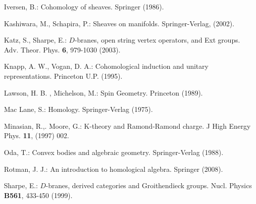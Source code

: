 \documentclass[xypic,amscd,syntonly,amssymb,verbatim,12pt]{amsart}
\theoremstyle{plain}
\theoremstyle{definition}
\theoremstyle{remark}
\numberwithin{equation}{section}
\begin{document}
\begin{thebibliography}{99}
Iversen, B.: Cohomology of sheaves.  Springer (1986).







 




 Kashiwara, M., Schapira, P.:  Sheaves on manifolds.
  Springer-Verlag,
 (2002).



 Katz, S., Sharpe, E.: $D$-branes, open string vertex operators, and Ext groups. Adv. Theor. Phys. {\bf 6},  979-1030 (2003).








 
  
  
 


 
 

 Knapp, A. W., Vogan, D. A.:  Cohomological induction and unitary representations.
 Princeton U.P. (1995).


 



 Lawson, H. B. , Michelson, M.: Spin Geometry. Princeton (1989).




 



 
 





Mac Lane, S.: Homology. Springer-Verlag (1975).


 Minasian, R.,. Moore, G.: K-theory and Ramond-Ramond charge. J High
 Energy Phys. {\bf 11}, (1997) 002.


Oda, T.: Convex bodies and algebraic geometry. Springer-Verlag
(1988).

 






Rotman, J. J.: An introduction to homological algebra. Springer
(2008).



Sharpe, E.: $D$-branes, derived categories and Groithendieck groups. Nucl. Physics {\bf B561},  433-450 (1999).



 
 

\end{thebibliography}
\end{document}

